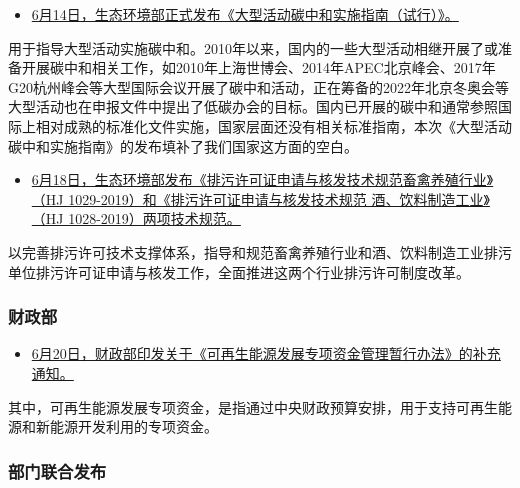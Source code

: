 \documentclass[]{book}
\providecommand{\tightlist}{%
  \setlength{\itemsep}{0pt}\setlength{\parskip}{0pt}}
\begin{document}
\begin{itemize}
\tightlist
\item
  \href{http://www.mee.gov.cn/xxgk2018/xxgk/xxgk01/201906/t20190617_706706.html}{6月14日，生态环境部正式发布《大型活动碳中和实施指南（试行）》。}
\end{itemize}

用于指导大型活动实施碳中和。2010年以来，国内的一些大型活动相继开展了或准备开展碳中和相关工作，如2010年上海世博会、2014年APEC北京峰会、2017年G20杭州峰会等大型国际会议开展了碳中和活动，正在筹备的2022年北京冬奥会等大型活动也在申报文件中提出了低碳办会的目标。国内已开展的碳中和通常参照国际上相对成熟的标准化文件实施，国家层面还没有相关标准指南，本次《大型活动碳中和实施指南》的发布填补了我们国家这方面的空白。

\begin{itemize}
\tightlist
\item
  \href{http://www.mee.gov.cn/xxgk2018/xxgk/xxgk01/201906/t20190621_707297.html}{6月18日，生态环境部发布《排污许可证申请与核发技术规范畜禽养殖行业》（HJ 1029-2019）和《排污许可证申请与核发技术规范 酒、饮料制造工业》（HJ 1028-2019）两项技术规范。}
\end{itemize}

以完善排污许可技术支撑体系，指导和规范畜禽养殖行业和酒、饮料制造工业排污单位排污许可证申请与核发工作，全面推进这两个行业排污许可制度改革。

\hypertarget{ux8d22ux653fux90e8-1}{%
\subsubsection*{财政部}\label{ux8d22ux653fux90e8-1}}

\begin{itemize}
\tightlist
\item
  \href{http://www.mof.gov.cn/mofhome/jinjijianshesi/zhengwuxinxi/zhengcefagui/201906/t20190617_3279412.html}{6月20日，财政部印发关于《可再生能源发展专项资金管理暂行办法》的补充通知。}
\end{itemize}

其中，可再生能源发展专项资金，是指通过中央财政预算安排，用于支持可再生能源和新能源开发利用的专项资金。

\hypertarget{ux90e8ux95e8ux8054ux5408ux53d1ux5e03-6}{%
\subsubsection*{部门联合发布}\label{ux90e8ux95e8ux8054ux5408ux53d1ux5e03-6}}
\end{document}
